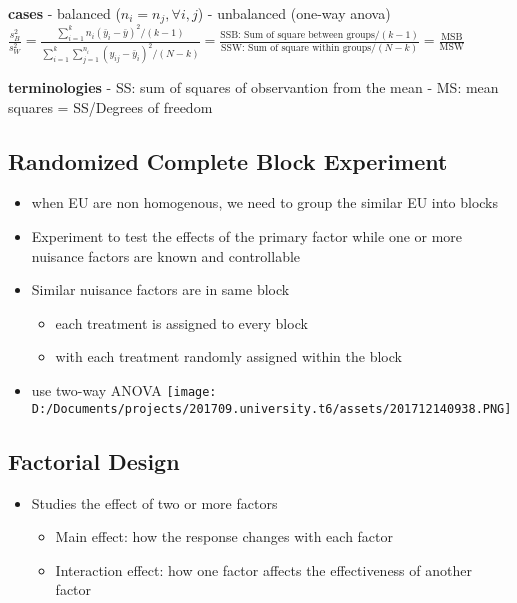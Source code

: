 \documentclass[11pt]{article}
\makeatletter
\def\maxwidth{\ifdim\Gin@nat@width>\linewidth\linewidth
    \else\Gin@nat@width\fi}
\let\Oldincludegraphics\includegraphics
\renewcommand{\includegraphics}[1]{\Oldincludegraphics[width=.8\maxwidth]{#1}}
\providecommand{\tightlist}{%
      \setlength{\itemsep}{0pt}\setlength{\parskip}{0pt}}
\makeatother
\begin{document}
\textbf{cases} - balanced (\(n_i=n_j, \forall i,j\)) - unbalanced
(one-way anova)\\
\(\frac{s^2_B}{s_W^2}=\frac{\sum_{i=1}^kn_i(\bar y_i-\bar y)^2/(k-1)}{\sum_{i=1}^k\sum_{j=1}^{n_i}(y_{ij}-\bar y_i)^2/(N-k)}=\frac{\text{SSB: Sum of square between groups}/(k-1)}{\text{SSW: Sum of square within groups}/(N-k)}=\frac{\text{MSB}}{\text{MSW}}\)

\textbf{terminologies} - SS: sum of squares of observantion from the
mean - MS: mean squares = SS/Degrees of freedom

\hypertarget{randomized-complete-block-experiment}{%
\subsection{Randomized Complete Block
Experiment}\label{randomized-complete-block-experiment}}

\begin{itemize}
\tightlist
\item
  when EU are non homogenous, we need to group the similar EU into
  blocks
\item
  Experiment to test the effects of the primary factor while one or more
  nuisance factors are known and controllable
\item
  Similar nuisance factors are in same block

  \begin{itemize}
  \tightlist
  \item
    each treatment is assigned to every block
  \item
    with each treatment randomly assigned within the block
  \end{itemize}
\item
  use two-way ANOVA
  \texttt{[image: D:/Documents/projects/201709.university.t6/assets/201712140938.PNG]}
\end{itemize}

    \hypertarget{factorial-design}{%
\subsection{Factorial Design}\label{factorial-design}}

\begin{itemize}
\tightlist
\item
  Studies the effect of two or more factors

  \begin{itemize}
  \tightlist
  \item
    Main effect: how the response changes with each factor
  \item
    Interaction effect: how one factor affects the effectiveness of
    another factor
  \end{itemize}
\end{itemize}
\end{document}
